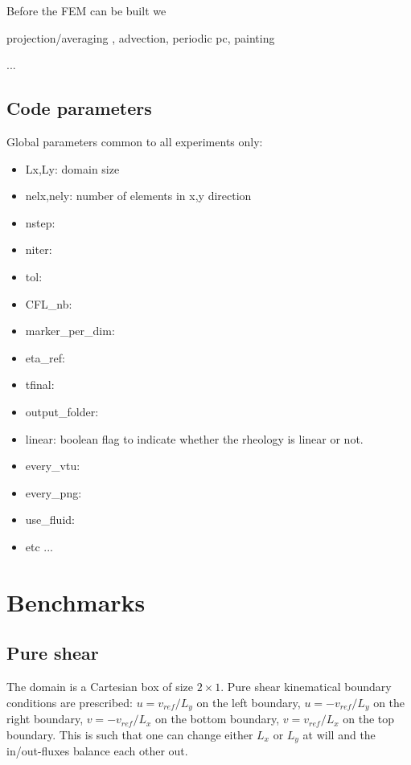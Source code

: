 \documentclass[a4paper]{article}
\newcommand{\python}{\color{darkgray} \sffamily }
\begin{document}
Before the FEM can be built we 


projection/averaging , advection, periodic pc, painting



...

\subsection{Code parameters}

Global parameters common to all experiments only:
\begin{itemize}
\item {\python Lx,Ly}: domain size
\item {\python nelx,nely}: number of elements in x,y direction 
\item {\python nstep}:
\item {\python niter}:
\item {\python tol}:
\item {\python CFL\_nb}:
\item {\python marker\_per\_dim}:
\item {\python eta\_ref}:
\item {\python tfinal}:
\item {\python output\_folder}:
\item {\python linear}: boolean flag to indicate whether the rheology is linear or not.
\item {\python every\_vtu}:
\item {\python every\_png}:
\item {\python use\_fluid}:
\item etc ...
\end{itemize}



\newpage
\section{Benchmarks}

\subsection{Pure shear}

The domain is a Cartesian box of size $2\times 1$.
Pure shear kinematical boundary conditions are prescribed:
$u=v_{ref}/L_y$ on the left boundary, 
$u=-v_{ref}/L_y$ on the right boundary, 
$v=-v_{ref}/L_x$ on the bottom boundary, 
$v=v_{ref}/L_x$ on the top boundary.
This is such that one can change either $L_x$ or $L_y$
at will and the in/out-fluxes balance each other out. 
\end{document}
